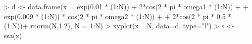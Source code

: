 \begin{CodeChunk}
\begin{CodeInput}


> d <- data.frame(x = exp(0.01 * (1:N)) + 2*cos(2 * pi * omega1 * (1:N)) +  
+   exp(0.009 * (1:N)) * cos(2 * pi * omega2 * (1:N)) + 
+   2*cos(2 * pi * 0.5 * (1:N))+ rnorm(N,1.2), N = 1:N)
> xyplot(x ~ N, data=d, type="l")
> s <- ssa(x)
\end{CodeInput}

\end{CodeChunk}